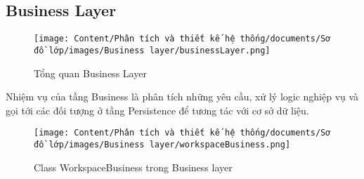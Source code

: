 \subsection{Business Layer}

\begin{figure}[H]
    \centering
    \texttt{[image: Content/Phân tích và thiết kế hệ thống/documents/Sơ đồ lớp/images/Business layer/businessLayer.png]}
    \vspace{0.5cm}
    \caption{Tổng quan Business Layer}
    \label{fig:Tổng quan Business Layer}
\end{figure}

Nhiệm vụ của tầng Business là phân tích những yêu cầu, xử lý logic nghiệp vụ và
gọi tới các đối tượng ở tầng Persistence để tương tác với cơ sở dữ liệu.

\begin{figure}[H]
    \centering
    \texttt{[image: Content/Phân tích và thiết kế hệ thống/documents/Sơ đồ lớp/images/Business layer/workspaceBusiness.png]}
    \vspace{0.5cm}
    \caption{Class WorkspaceBusiness trong Business layer}
    \label{fig:Class WorkspaceBusiness trong Business layer}
\end{figure}

